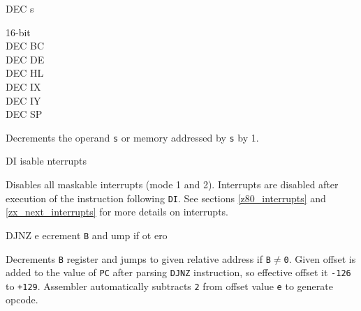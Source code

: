\begin{basedescript}{
	\desclabelstyle{\multilinelabel}
	\desclabelwidth{3cm}}
\begin{DetailItem}{DEC s}
\begin{DetailVariants}
			\columnbreak
			\textnormal{16-bit}\\
			DEC BC\\
			DEC DE\\
			DEC HL\\
			DEC IX\\
			DEC IY\\
			DEC SP
		\end{DetailVariants}

		Decrements the operand {\tt s} or memory addressed by {\tt s} by 1.

		\begin{DetailEffects}[v]
			\FlagsDECr[8-bit]
		\end{DetailEffects}
		
		\begin{DetailTiming}
		\end{DetailTiming}

	\end{DetailItem}

	\pagebreak
	\begin{DetailItem}{DI}
		{isable nterrupts}
		{\SymDI}

		Disables all maskable interrupts (mode 1 and 2). Interrupts are disabled after execution of the instruction following {\tt DI}. See sections \ref{z80_interrupts} and \ref{zx_next_interrupts} for more details on interrupts.
		
		\begin{DetailEffects}
			\FlagsDI
		\end{DetailEffects}
				
		\begin{DetailTiming}
			\DetailTime{1}{4}
		\end{DetailTiming}

	\end{DetailItem}

	\begin{DetailItem}{DJNZ e}
		{ecrement {\tt B} and ump if ot \IH{Z}ero}
		{\SymDJNZ{e}}

		Decrements {\tt B} register and jumps to given relative address if {\tt B$\neq$0}. Given offset is added to the value of {\tt PC} after parsing {\tt DJNZ} instruction, so effective offset it {\tt -126} to {\tt +129}. Assembler automatically subtracts {\tt 2} from offset value {\tt e} to generate opcode.


\end{DetailItem}
\end{basedescript}

